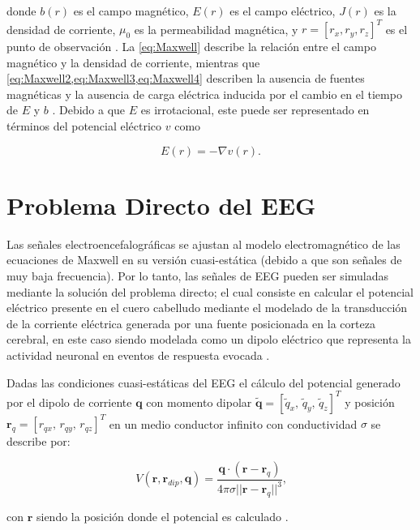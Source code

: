 donde $b(r)$ es el campo magnético, $E(r)$ es el campo eléctrico, $J(r)$ es la densidad de corriente, $\mu_{0}$ es la permeabilidad magnética, y $r = [r_x, r_y, r_z]^T$ es el punto de observación \cite{Gutierrez2008}. La \cref{eq:Maxwell} describe la relación entre el campo magnético y la densidad de corriente, mientras que \cref{eq:Maxwell2,eq:Maxwell3,eq:Maxwell4} describen la ausencia de fuentes magnéticas y la ausencia de carga eléctrica inducida por el cambio en el tiempo de $E$ y $b$ \cite{Hamalainen1993}. Debido a que $E$ es irrotacional, este puede ser representado en términos del potencial eléctrico $v$ como

\begin{equation}
	E(r) = -\nabla v(r)\text{.} \label{eq:potencial}
\end{equation}




\section{Problema Directo del EEG}
\label{sec:methodology:direct}

Las señales electroencefalográficas se ajustan al modelo electromagnético de las ecuaciones de Maxwell en su versión cuasi-estática (debido a que son señales de muy baja frecuencia). Por lo tanto, las señales de EEG pueden ser simuladas mediante la solución del problema directo; el cual consiste en calcular el potencial eléctrico presente en el cuero cabelludo mediante el modelado de la transducción de la corriente eléctrica generada por una fuente posicionada en la corteza cerebral, en este caso siendo modelada como un dipolo eléctrico que representa la actividad neuronal en eventos de respuesta evocada \cite{Mosher1999, Hallez2007}.

Dadas las condiciones cuasi-estáticas del EEG \cite{Plonsey1967} el cálculo del potencial generado por el dipolo de corriente $\mathbf{q}$ con momento dipolar  $\mathbf{\tilde{q}} = [\tilde{q}_x,\,\tilde{q}_y,\,\tilde{q}_z]^T$ y posición $\mathbf{r}_{q} = [r_{qx},\,r_{qy},\,r_{qz}]^T$ en un medio conductor infinito con conductividad $\sigma$ se describe por:

\begin{equation}
	\label{fdip}
	V(\mathbf{r},\mathbf{r}_{dip},\mathbf{q})=\frac{\mathbf{q}\cdot(\mathbf{r}-\mathbf{r}_{q})}{4\pi \sigma {||\mathbf{r}-\mathbf{r}_{q}||}^{3}}\text{,}
\end{equation}

con $\mathbf{r}$ siendo la posición donde el potencial es calculado \cite{Hallez2007}.

